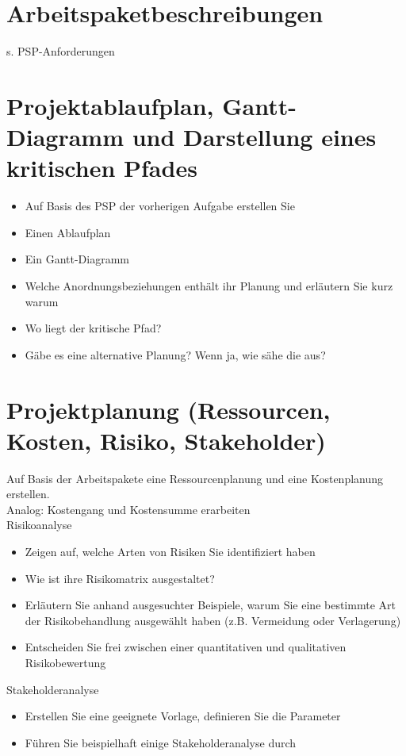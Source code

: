 \documentclass[12pt]{article}
\begin{document}
\section{Arbeitspaketbeschreibungen}
s. PSP-Anforderungen

\section{Projektablaufplan, Gantt-Diagramm und Darstellung eines kritischen Pfades}
\begin{itemize}
	\item Auf Basis des PSP der vorherigen Aufgabe erstellen Sie
	\item Einen Ablaufplan
	\item Ein Gantt-Diagramm
	\item Welche Anordnungsbeziehungen enthält ihr Planung und erläutern Sie kurz warum
	\item Wo liegt der kritische Pfad?
	\item Gäbe es eine alternative Planung? Wenn ja, wie sähe die aus?
\end{itemize}

\section{Projektplanung (Ressourcen, Kosten, Risiko, Stakeholder)}
Auf Basis der Arbeitspakete eine Ressourcenplanung und eine Kostenplanung erstellen.\\
Analog: Kostengang und Kostensumme erarbeiten\\
Risikoanalyse
\begin{itemize}
	\item Zeigen auf, welche Arten von Risiken Sie identifiziert haben
	\item Wie ist ihre Risikomatrix ausgestaltet?
	\item Erläutern Sie anhand ausgesuchter Beispiele, warum Sie eine bestimmte Art der Risikobehandlung ausgewählt haben (z.B. Vermeidung oder Verlagerung)
\item Entscheiden Sie frei zwischen einer quantitativen und qualitativen Risikobewertung
\end{itemize}
Stakeholderanalyse
\begin{itemize}
	\item Erstellen Sie eine geeignete Vorlage, definieren Sie die Parameter
	\item Führen Sie beispielhaft einige Stakeholderanalyse durch
\end{itemize}
\end{document}
